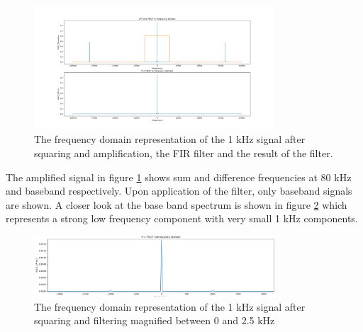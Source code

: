 \begin{figure}[ht!]
    \centering
    \includegraphics[width=0.8\textwidth]{Figures/SigSimulation/yRxsqr_LPFfftAmp1000.png}
    \caption{The frequency domain representation of the 1 kHz signal after squaring and amplification, the FIR filter and the result of the filter.}
    \label{fig:sqrfiltamp}
\end{figure}
The amplified signal in figure \ref{fig:sqrfiltamp} shows sum and difference frequencies at 80 kHz and baseband respectively. Upon application of the filter, only baseband signals are shown. A closer look at the base band spectrum is shown in figure \ref{fig:sqrcrop} which represents a strong low frequency component with very small 1 kHz components.
\begin{figure}[ht!]
    \centering
    \includegraphics[width=0.8\textwidth]{Figures/SigSimulation/cropzoomedinyRxfilt.png}
    \caption{The frequency domain representation of the 1 kHz signal after squaring and filtering magnified between 0 and 2.5 kHz}
    \label{fig:sqrcrop}
\end{figure}

